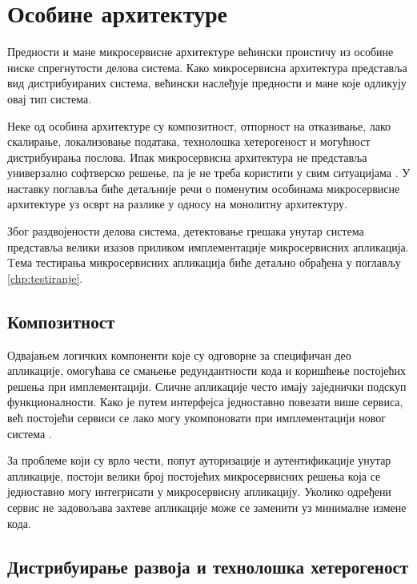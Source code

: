 \documentclass[12pt,oneside]{memoir}
\begin{document}
 \newpage

\section{Особине архитектуре}

Предности и мане микросервисне архитектуре већински проистичу из особине ниске спрегнутости делова система. Како микросервисна архитектура представља вид дистрибуираних система, већински наслеђује предности и мане које одликују овај тип система.

Неке од особина архитектуре су композитност, отпорност на отказивање, лако скалирање, локализовање података, технолошка хетерогеност и могућност дистрибуирања послова. Ипак микросервисна архитектура не представља универзално софтверско решење, па је не треба користити у свим ситуацијама \cite{microservicesBook}. У наставку поглавља биће детаљније речи о поменутим особинама микросервисне архитектуре уз осврт на разлике у односу на монолитну архитектуру. 

Због раздвојености делова система, детектовање грешака унутар система представља велики изазов приликом имплементације микросервисних апликација. Tема тестирања микросервисних апликација биће детаљно обрађена у поглављу \ref{chp:testiranje}.

\subsection{Композитност}

Одвајањем логичких компоненти које су одговорне за специфичан део апликације, омогућава се смањење редундантности кода и коришћење постојећих решења при имплементацији. Сличне апликације често имају заједнички подскуп функционалности. Како је путем интерфејса једноставно повезати више сервиса, већ постојећи сервиси се лако могу укомпоновати при имплементацији новог система \cite{microservicesBook}. 

За проблеме који су врло чести, попут ауторизације и аутентификације унутар апликације, постоји велики број постојећих микросервисних решења која се једноставно могу интегрисати у микросервисну апликацију. Уколико одређени сервис не задовољава захтеве апликације може се заменити уз минималне измене кода.

\subsection{Дистрибуирање развоја и технолошка хетерогеност}
\end{document}

